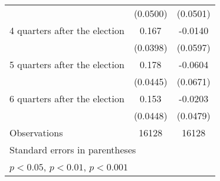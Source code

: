 \begin{table}[htbp]
\begin{tabular}{l*{2}{c}}
                    &    (0.0500)         &    (0.0501)         \\
[1em]
 4 quarters after the election&       0.167\sym{***}&     -0.0140         \\
                    &    (0.0398)         &    (0.0597)         \\
[1em]
 5 quarters after the election&       0.178\sym{***}&     -0.0604         \\
                    &    (0.0445)         &    (0.0671)         \\
[1em]
 6 quarters after the election&       0.153\sym{***}&     -0.0203         \\
                    &    (0.0448)         &    (0.0479)         \\
\hline
Observations        &       16128         &       16128         \\
\hline\hline
\multicolumn{3}{l}{\footnotesize Standard errors in parentheses}\\
\multicolumn{3}{l}{\footnotesize \sym{*} \(p<0.05\), \sym{**} \(p<0.01\), \sym{***} \(p<0.001\)}\\
\end{tabular}
\end{table}
